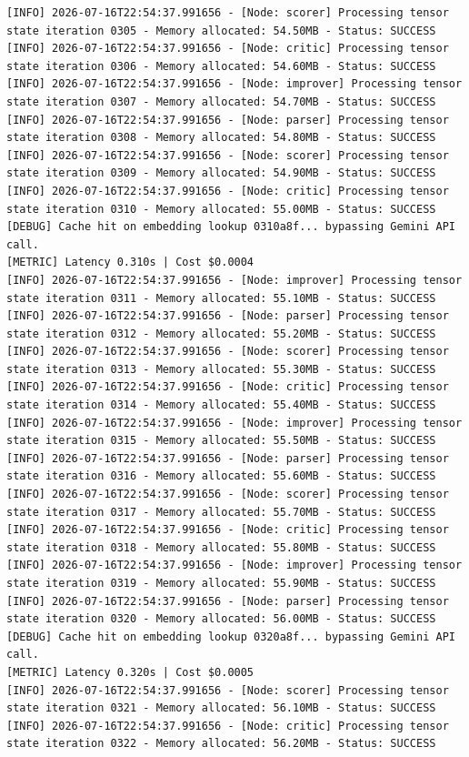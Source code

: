 \documentclass[10pt,journal,compsoc]{IEEEtran}
\begin{document}
\begin{verbatim}
[INFO] 2026-07-16T22:54:37.991656 - [Node: scorer] Processing tensor state iteration 0305 - Memory allocated: 54.50MB - Status: SUCCESS
[INFO] 2026-07-16T22:54:37.991656 - [Node: critic] Processing tensor state iteration 0306 - Memory allocated: 54.60MB - Status: SUCCESS
[INFO] 2026-07-16T22:54:37.991656 - [Node: improver] Processing tensor state iteration 0307 - Memory allocated: 54.70MB - Status: SUCCESS
[INFO] 2026-07-16T22:54:37.991656 - [Node: parser] Processing tensor state iteration 0308 - Memory allocated: 54.80MB - Status: SUCCESS
[INFO] 2026-07-16T22:54:37.991656 - [Node: scorer] Processing tensor state iteration 0309 - Memory allocated: 54.90MB - Status: SUCCESS
[INFO] 2026-07-16T22:54:37.991656 - [Node: critic] Processing tensor state iteration 0310 - Memory allocated: 55.00MB - Status: SUCCESS
[DEBUG] Cache hit on embedding lookup 0310a8f... bypassing Gemini API call.
[METRIC] Latency 0.310s | Cost $0.0004
[INFO] 2026-07-16T22:54:37.991656 - [Node: improver] Processing tensor state iteration 0311 - Memory allocated: 55.10MB - Status: SUCCESS
[INFO] 2026-07-16T22:54:37.991656 - [Node: parser] Processing tensor state iteration 0312 - Memory allocated: 55.20MB - Status: SUCCESS
[INFO] 2026-07-16T22:54:37.991656 - [Node: scorer] Processing tensor state iteration 0313 - Memory allocated: 55.30MB - Status: SUCCESS
[INFO] 2026-07-16T22:54:37.991656 - [Node: critic] Processing tensor state iteration 0314 - Memory allocated: 55.40MB - Status: SUCCESS
[INFO] 2026-07-16T22:54:37.991656 - [Node: improver] Processing tensor state iteration 0315 - Memory allocated: 55.50MB - Status: SUCCESS
[INFO] 2026-07-16T22:54:37.991656 - [Node: parser] Processing tensor state iteration 0316 - Memory allocated: 55.60MB - Status: SUCCESS
[INFO] 2026-07-16T22:54:37.991656 - [Node: scorer] Processing tensor state iteration 0317 - Memory allocated: 55.70MB - Status: SUCCESS
[INFO] 2026-07-16T22:54:37.991656 - [Node: critic] Processing tensor state iteration 0318 - Memory allocated: 55.80MB - Status: SUCCESS
[INFO] 2026-07-16T22:54:37.991656 - [Node: improver] Processing tensor state iteration 0319 - Memory allocated: 55.90MB - Status: SUCCESS
[INFO] 2026-07-16T22:54:37.991656 - [Node: parser] Processing tensor state iteration 0320 - Memory allocated: 56.00MB - Status: SUCCESS
[DEBUG] Cache hit on embedding lookup 0320a8f... bypassing Gemini API call.
[METRIC] Latency 0.320s | Cost $0.0005
[INFO] 2026-07-16T22:54:37.991656 - [Node: scorer] Processing tensor state iteration 0321 - Memory allocated: 56.10MB - Status: SUCCESS
[INFO] 2026-07-16T22:54:37.991656 - [Node: critic] Processing tensor state iteration 0322 - Memory allocated: 56.20MB - Status: SUCCESS

\end{verbatim}
\end{document}
